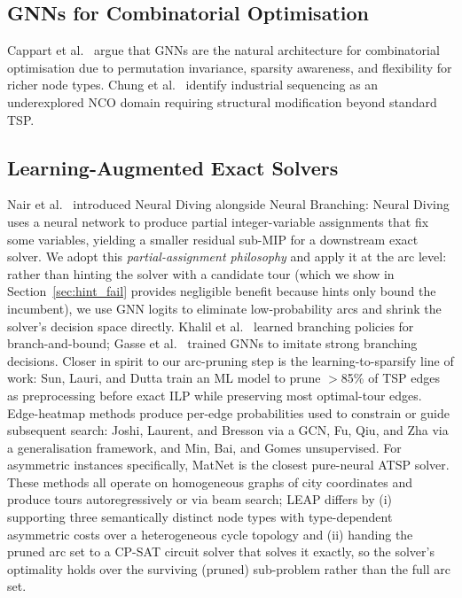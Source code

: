 \documentclass[review,times]{elsarticle}
\begin{document}
\subsection{GNNs for Combinatorial Optimisation}

Cappart et al.\ \cite{cappart2023gnnco} argue that GNNs are the natural architecture for combinatorial optimisation due to permutation invariance, sparsity awareness, and flexibility for richer node types. Chung et al.\ \cite{chung2025ncosurvey} identify industrial sequencing as an underexplored NCO domain requiring structural modification beyond standard TSP.

\subsection{Learning-Augmented Exact Solvers}

Nair et al.\ \cite{nair2021neural} introduced Neural Diving alongside Neural Branching: Neural Diving uses a neural network to produce partial integer-variable assignments that fix some variables, yielding a smaller residual sub-MIP for a downstream exact solver. We adopt this \emph{partial-assignment philosophy} and apply it at the arc level: rather than hinting the solver with a candidate tour (which we show in Section~\ref{sec:hint_fail} provides negligible benefit because hints only bound the incumbent), we use GNN logits to eliminate low-probability arcs and shrink the solver's decision space directly. Khalil et al.\ \cite{khalil2016learning} learned branching policies for branch-and-bound; Gasse et al.\ \cite{gasse2019exact} trained GNNs to imitate strong branching decisions. Closer in spirit to our arc-pruning step is the learning-to-sparsify line of work: Sun, Lauri, and Dutta \cite{sun2021sparsify} train an ML model to prune $>$85\% of TSP edges as preprocessing before exact ILP while preserving most optimal-tour edges. Edge-heatmap methods produce per-edge probabilities used to constrain or guide subsequent search: Joshi, Laurent, and Bresson \cite{joshi2019gcntsp} via a GCN, Fu, Qiu, and Zha \cite{fu2021gentsp} via a generalisation framework, and Min, Bai, and Gomes \cite{min2023utsp} unsupervised. For asymmetric instances specifically, MatNet \cite{kwon2021matnet} is the closest pure-neural ATSP solver. These methods all operate on homogeneous graphs of city coordinates and produce tours autoregressively or via beam search; LEAP differs by (i) supporting three semantically distinct node types with type-dependent asymmetric costs over a heterogeneous cycle topology and (ii) handing the pruned arc set to a CP-SAT circuit solver that solves it exactly, so the solver's optimality holds over the surviving (pruned) sub-problem rather than the full arc set.
\end{document}
